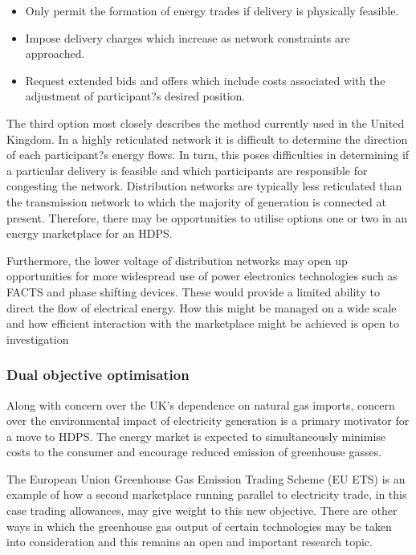 \begin{itemize}
  \item Only permit the formation of energy trades if delivery is physically
  feasible.
  \item Impose delivery charges which increase as network constraints are
   approached.
  \item Request extended bids and offers which include costs associated with
  the adjustment of participant?s desired position.
\end{itemize}

The third option most closely describes the method currently used in the United
Kingdom.  In a highly reticulated network it is difficult to determine the
direction of each participant?s energy flows.  In turn, this poses
difficulties in determining if a particular delivery is feasible and which
participants are responsible for congesting the network.  Distribution
networks are typically less reticulated than the transmission network to which
the majority of generation is connected at present.  Therefore, there may be
opportunities to utilise options one or two in an energy marketplace for an
HDPS.

Furthermore, the lower voltage of distribution networks may open up
opportunities for more widespread use of power electronics technologies such
as FACTS and phase shifting devices.  These would provide a limited ability to
direct the flow of electrical energy.  How this might be managed on a wide
scale and how efficient interaction with the marketplace might be achieved is
open to investigation

\subsubsection{Dual objective optimisation}
Along with concern over the UK's dependence on natural gas imports, concern
over the environmental impact of electricity generation is a primary motivator
for a move to HDPS.  The energy market is expected to simultaneously minimise
costs to the consumer and encourage reduced emission of greenhouse gasses.

The European Union Greenhouse Gas Emission Trading Scheme (EU ETS) is an
example of how a second marketplace running parallel to electricity trade, in
this case trading allowances, may give weight to this new objective.  There
are other ways in which the greenhouse gas output of certain technologies may
be taken into consideration and this remains an open and important research
topic.
